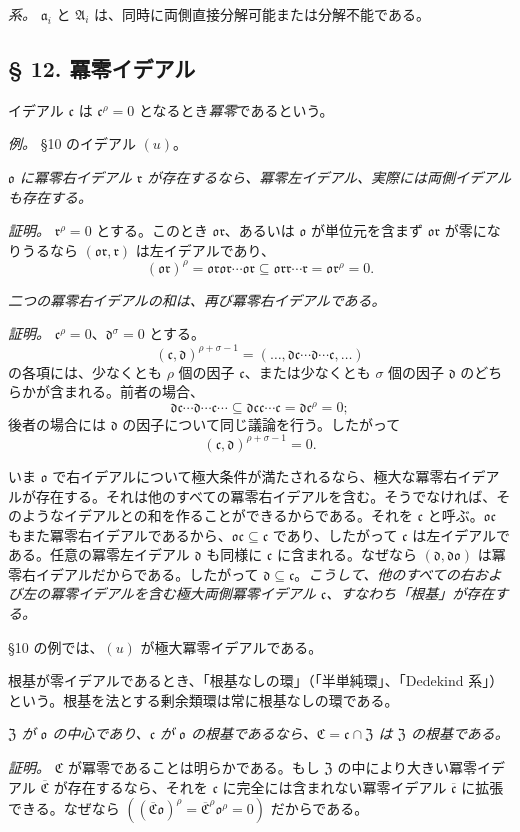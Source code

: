 \documentclass[11pt]{article}
\providecommand{\mA}{\mathfrak{A}}
\providecommand{\mC}{\mathfrak{C}}
\providecommand{\mo}{\mathfrak{o}}
\providecommand{\ma}{\mathfrak{a}}
\providecommand{\mc}{\mathfrak{c}}
\providecommand{\md}{\mathfrak{d}}
\providecommand{\mr}{\mathfrak{r}}
\providecommand{\mZ}{\mathfrak{Z}}
\begin{document}
\emph{系。} $\ma_i$ と $\mA_i$ は、同時に両側直接分解可能または分解不能である。

\subsection*{§ 12. 冪零イデアル}

イデアル $\mc$ は $\mc^\rho=0$ となるとき\emph{冪零}であるという。

\emph{例。} §10 のイデアル $(u)$。

\emph{$\mo$ に冪零右イデアル $\mr$ が存在するなら、冪零左イデアル、実際には両側イデアルも存在する。}

\emph{証明。} $\mr^\rho=0$ とする。このとき $\mo\mr$、あるいは $\mo$ が単位元を含まず $\mo\mr$ が零になりうるなら $(\mo\mr,\mr)$ は左イデアルであり、
\[
        (\mo\mr)^\rho=\mo\mr\mo\mr\cdots\mo\mr\subseteq\mo\mr\mr\cdots\mr=\mo\mr^\rho=0.
\]

\emph{二つの冪零右イデアルの和は、再び冪零右イデアルである。}

\emph{証明。} $\mc^\rho=0$、$\md^\sigma=0$ とする。
\[
        (\mc,\md)^{\rho+\sigma-1}=(\ldots,\md\mc\cdots\md\cdots\mc,\ldots)
\]
の各項には、少なくとも $\rho$ 個の因子 $\mc$、または少なくとも $\sigma$ 個の因子 $\md$ のどちらかが含まれる。前者の場合、
\[
        \md\mc\cdots\md\cdots\mc\cdots\subseteq\md\mc\mc\cdots\mc=\md\mc^\rho=0;
\]
後者の場合には $\md$ の因子について同じ議論を行う。したがって
\[
        (\mc,\md)^{\rho+\sigma-1}=0.
\]

いま $\mo$ で右イデアルについて極大条件が満たされるなら、極大な冪零右イデアルが存在する。それは他のすべての冪零右イデアルを含む。そうでなければ、そのようなイデアルとの和を作ることができるからである。それを $\mc$ と呼ぶ。$\mo\mc$ もまた冪零右イデアルであるから、$\mo\mc\subseteq\mc$ であり、したがって $\mc$ は左イデアルである。任意の冪零左イデアル $\md$ も同様に $\mc$ に含まれる。なぜなら $(\md,\md\mo)$ は冪零右イデアルだからである。したがって $\md\subseteq\mc$。\emph{こうして、他のすべての右および左の冪零イデアルを含む極大両側冪零イデアル $\mc$、すなわち「根基」が存在する。}

§10 の例では、$(u)$ が極大冪零イデアルである。

根基が零イデアルであるとき、「根基なしの環」（「半単純環」、「Dedekind 系」）という。根基を法とする剰余類環は常に根基なしの環である。

\emph{$\mZ$ が $\mo$ の中心であり、$\mc$ が $\mo$ の根基であるなら、$\mC=\mc\cap\mZ$ は $\mZ$ の根基である。}

\emph{証明。} $\mC$ が冪零であることは明らかである。もし $\mZ$ の中により大きい冪零イデアル $\overline{\mC}$ が存在するなら、それを $\mc$ に完全には含まれない冪零イデアル $\overline{\mc}$ に拡張できる。なぜなら $((\overline{\mC}\mo)^\rho=\overline{\mC}^{\rho}\mo^\rho=0)$ だからである。
\end{document}
